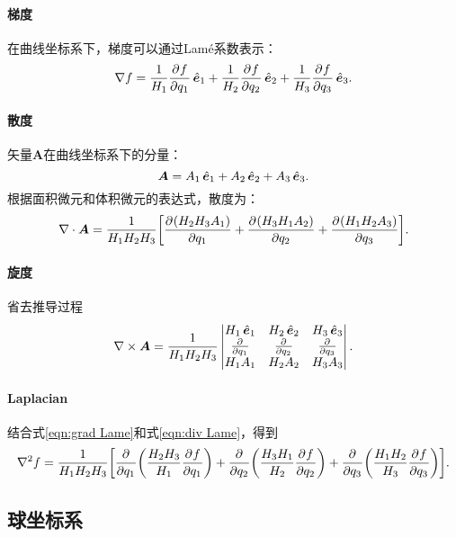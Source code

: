 \paragraph{梯度}
在曲线坐标系下，梯度可以通过Lam\'e系数表示：
\begin{equation}
    \label{eqn:grad Lame}
    \nabla f=\frac1{H_1}\pv f{q_1}\uvec e_1+\frac1{H_2}\pv f{q_2}\uvec e_2+\frac1{H_3}\pv f{q_3}\uvec e_3.
\end{equation}

\paragraph{散度}
矢量$\bm A$在曲线坐标系下的分量：
\[
    \bm A=A_1\mathop{}\!\hat{\bm{e}}_1+A_2\mathop{}\!\hat{\bm{e}}_2+A_3\mathop{}\!\hat{\bm{e}}_3.
\]
根据面积微元和体积微元的表达式，散度为：
\begin{equation}
    \label{eqn:div Lame}
    \div\bm A=\frac1{H_1H_2H_3}\biggfkh{\pv{(H_2H_3A_1)}{q_1}+\pv{(H_3H_1A_2)}{q_2}+\pv{(H_1H_2A_3)}{q_3}}.
\end{equation}

\paragraph{旋度}
省去推导过程
\begin{equation}
    \label{eqn:curl Lame}
    \curl\bm A=\frac1{H_1H_2H_3}\begin{vmatrix}
        H_1\uvec e_1&H_2\uvec e_2&H_3\uvec e_3\\
        \pp{q_1}&\pp{q_2}&\pp{q_3}\\
        H_1A_1&H_2A_2&H_3A_3
    \end{vmatrix}.
\end{equation}

\paragraph{Laplacian}
结合式\eqref{eqn:grad Lame}和式\eqref{eqn:div Lame}，得到
\begin{equation}
    \label{eqn:Laplacian Lame}
    \lap f=\frac1{H_1H_2H_3}\biggfkh{\pp{q_1}\biggkh{\frac{H_2H_3}{H_1}\pv f{q_1}}+\pp{q_2}\biggkh{\frac{H_3H_1}{H_2}\pv f{q_2}}+\pp{q_3}\biggkh{\frac{H_1H_2}{H_3}\pv f{q_3}}}.
\end{equation}

\subsection{球坐标系}

